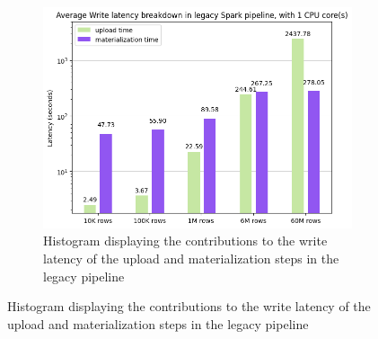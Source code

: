 \begin{figure}
    \centering
    \begin{subfigure}[b]{\textwidth}
        \includegraphics[width=\textwidth]{figures/5-results/hudi_virtualiz_1_core.png}
        \caption{Histogram displaying the contributions to the write latency of the upload and materialization steps in the legacy pipeline}
        \label{fig:hudi_virtualiz_breakdown}
    \end{subfigure}
    

\end{figure}
